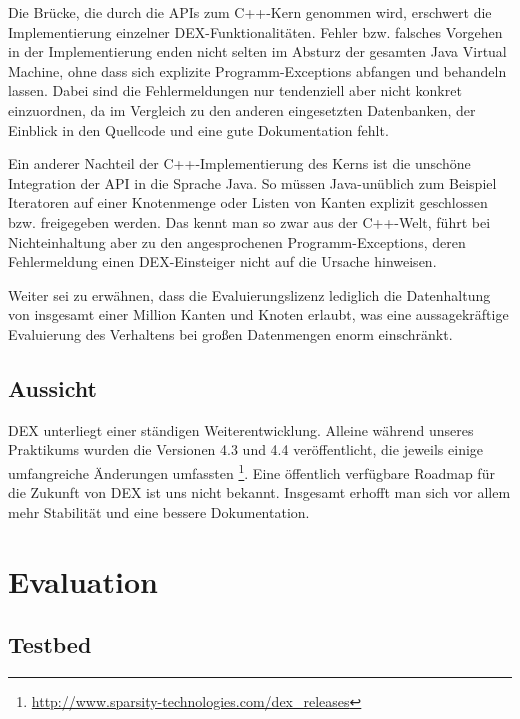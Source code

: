\documentclass[11pt, a4paper, oneside]{article} %
\begin{document}
Die Brücke, die durch die APIs zum C++-Kern genommen wird, erschwert die Implementierung einzelner DEX-Funktionalitäten. Fehler bzw. falsches Vorgehen in der Implementierung enden nicht selten im Absturz der gesamten Java Virtual Machine, ohne dass sich explizite Programm-Exceptions abfangen und behandeln lassen. Dabei sind die Fehlermeldungen nur tendenziell aber nicht konkret einzuordnen, da im Vergleich zu den anderen eingesetzten Datenbanken, der Einblick in den Quellcode und eine gute Dokumentation fehlt. 

Ein anderer Nachteil der C++-Implementierung des Kerns ist die unschöne Integration der API in die Sprache Java. So müssen Java-unüblich zum Beispiel Iteratoren auf einer Knotenmenge oder Listen von Kanten explizit geschlossen bzw. freigegeben werden. Das kennt man so zwar aus der C++-Welt, führt bei Nichteinhaltung aber zu den angesprochenen Programm-Exceptions, deren Fehlermeldung einen DEX-Einsteiger nicht auf die Ursache hinweisen.

Weiter sei zu erwähnen, dass die Evaluierungslizenz lediglich die Datenhaltung von insgesamt einer Million Kanten und Knoten erlaubt, was eine aussagekräftige Evaluierung des Verhaltens bei großen Datenmengen enorm einschränkt.

\subsection{Aussicht}

DEX unterliegt einer ständigen Weiterentwicklung. Alleine während unseres Praktikums wurden die Versionen 4.3 und 4.4 veröffentlicht, die jeweils einige umfangreiche Änderungen umfassten \footnote{\url{http://www.sparsity-technologies.com/dex_releases}}. Eine öffentlich verfügbare Roadmap für die Zukunft von DEX ist uns nicht bekannt. Insgesamt erhofft man sich vor allem mehr Stabilität und eine bessere Dokumentation.

\section{Evaluation}

\subsection{Testbed}
\end{document}
